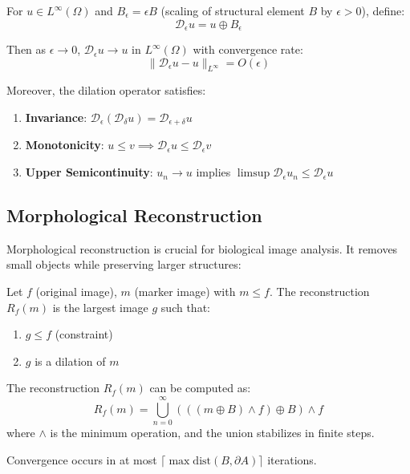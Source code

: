 \documentclass[twocolumn,11pt]{article}
\begin{document}
\begin{theorem}
For $u \in L^{\infty}(\Omega)$ and $B_\epsilon = \epsilon B$ (scaling of structural element $B$ by $\epsilon > 0$), define:
\begin{equation}
\mathcal{D}_\epsilon u = u \oplus B_\epsilon
\end{equation}

Then as $\epsilon \to 0$, $\mathcal{D}_\epsilon u \to u$ in $L^\infty(\Omega)$ with convergence rate:
\begin{equation}
\|\mathcal{D}_\epsilon u - u\|_{L^\infty} = O(\epsilon)
\end{equation}

Moreover, the dilation operator satisfies:
\begin{enumerate}
\item \textbf{Invariance}: $\mathcal{D}_\epsilon(\mathcal{D}_\delta u) = \mathcal{D}_{\epsilon+\delta} u$
\item \textbf{Monotonicity}: $u \leq v \implies \mathcal{D}_\epsilon u \leq \mathcal{D}_\epsilon v$
\item \textbf{Upper Semicontinuity}: $u_n \to u$ implies $\limsup \mathcal{D}_\epsilon u_n \leq \mathcal{D}_\epsilon u$
\end{enumerate}
\end{theorem}

\subsection{Morphological Reconstruction}

Morphological reconstruction is crucial for biological image analysis. It removes small objects while preserving larger structures:

\begin{definition}
Let $f$ (original image), $m$ (marker image) with $m \leq f$. The reconstruction $R_f(m)$ is the largest image $g$ such that:
\begin{enumerate}
\item $g \leq f$ (constraint)
\item $g$ is a dilation of $m$
\end{enumerate}
\end{definition}

\begin{theorem}
The reconstruction $R_f(m)$ can be computed as:
\begin{equation}
R_f(m) = \bigcup_{n=0}^\infty (((m \oplus B) \wedge f) \oplus B) \wedge f
\end{equation}
where $\wedge$ is the minimum operation, and the union stabilizes in finite steps.

Convergence occurs in at most $\lceil \max \text{dist}(B, \partial A) \rceil$ iterations.
\end{theorem}
\end{document}
